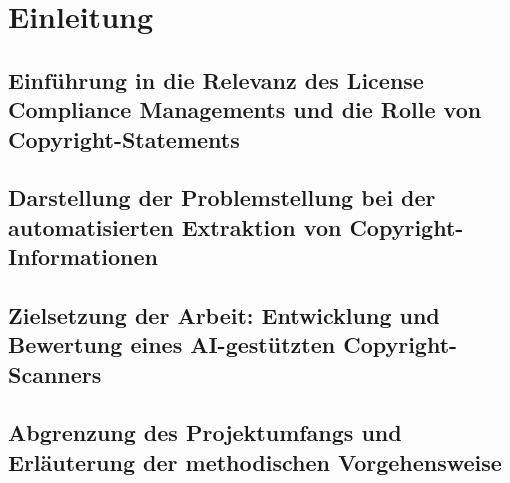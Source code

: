 \chapter{Einleitung}\label{ch:einleitung}


\section{Einführung in die Relevanz des License Compliance Managements und die Rolle von Copyright-Statements}\label{sec:einfuhrung}


\section{Darstellung der Problemstellung bei der automatisierten Extraktion von Copyright-Informationen}\label{sec:problemstellung}


\section{Zielsetzung der Arbeit: Entwicklung und Bewertung eines AI-gestützten Copyright-Scanners}\label{sec:zielsetzung}


\section{Abgrenzung des Projektumfangs und Erläuterung der methodischen Vorgehensweise}\label{sec:abgrenzung}